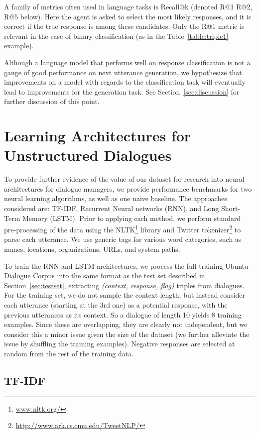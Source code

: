 \documentclass[11pt,a4paper]{article}
\begin{document}
A family of metrics often used in language tasks is Recall@k (denoted R@1 R@2, R@5 below).  Here the agent is asked to select the  most likely responses, and it is correct if the true response is among these  candidates.  Only the R@1 metric is relevant in the case of binary classification (as in the Table~\ref{table:triple1} example).

Although a language model that performs well on response classification is not a gauge of good performance on next utterance generation, we hypothesize that improvements on a model with regards to the classification task will eventually lead to improvements for the generation task.  See Section~\ref{sec:discussion} for further discussion of this point.



\section{Learning Architectures for Unstructured Dialogues}
\label{sec:learning}
To provide further evidence of the value of our dataset for research into neural architectures for dialogue managers, we provide performance benchmarks for two neural learning algorithms, as well as one naive baseline. The approaches considered are: TF-IDF, Recurrent Neural networks (RNN), and Long Short-Term Memory (LSTM). Prior to applying each method, we perform standard pre-processing of the data using the NLTK\footnote{\url{www.nltk.org/}} library and Twitter tokenizer\footnote{\url{http://www.ark.cs.cmu.edu/TweetNLP/}} to parse each utterance. We use generic tags for various word categories, such as names, locations, organizations, URLs, and system paths.
  
To train the RNN and LSTM architectures, we process the full training Ubuntu Dialogue Corpus into the same format as the test set described in Section~\ref{sec:testset}, extracting \emph{(context, response, flag)} triples from dialogues.  For the training set, we do not sample the context length, but instead consider each utterance (starting at the 3rd one) as a potential response, with the previous utterances as its context.  So a dialogue of length 10 yields 8 training examples. Since these are overlapping, they are clearly not independent, but we consider this a minor issue given the size of the dataset (we further alleviate the issue by shuffling the training examples).  Negative responses are selected at random from the rest of the training data.


\subsection{TF-IDF}
\end{document}
